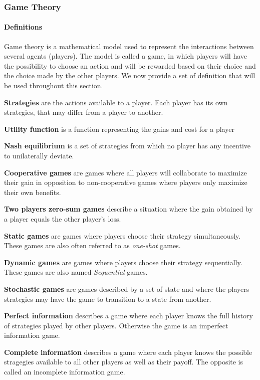 \subsubsection{Game Theory}


\paragraph{Definitions}
Game theory is a mathematical model used to represent the interactions between several agents (\ie players).
The model is called a game, in which players will have the possibility to choose an action and will be rewarded based on their choice and the choice made by the other players.
We now provide a set of definition that will be used throughout this section.

\textbf{Strategies} are the actions available to a player. Each player has its own strategies, that may differ from a player to another.

\textbf{Utility function} is a function representing the gains and cost for a player

\textbf{Nash equilibrium} is a set of strategies from which no player has any incentive to unilaterally deviate.

\textbf{Cooperative games} are games where all players will collaborate to maximize their gain in opposition to non-cooperative games where players only maximize their own benefits.

\textbf{Two players zero-sum games} describe a situation where the gain obtained by a player equals the other player's loss.

\textbf{Static games} are games where players choose their strategy simultaneously. These games are also often referred to as \textit{one-shot} games.

\textbf{Dynamic games} are games where players choose their strategy sequentially. These games are also named \textit{Sequential} games.

\textbf{Stochastic games} are games described by a set of state and where the players strategies may have the game to transition to a state from another.

\textbf{Perfect information} describes a game where each player knows the full history of strategies played by other players. Otherwise the game is an imperfect information game.

\textbf{Complete information} describes a game where each player knows the possible stragegies available to all other players as well as their payoff. The opposite is called an incomplete information game.

